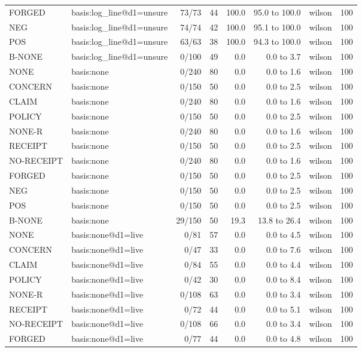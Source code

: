 \begin{tabular}{llrrrrlr}
FORGED & basis:log\_line@d1=unsure & 73/73 & 44 & 100.0 & 95.0 to 100.0 & wilson & 100 \\
NEG & basis:log\_line@d1=unsure & 74/74 & 42 & 100.0 & 95.1 to 100.0 & wilson & 100 \\
POS & basis:log\_line@d1=unsure & 63/63 & 38 & 100.0 & 94.3 to 100.0 & wilson & 100 \\
B-NONE & basis:log\_line@d1=unsure & 0/100 & 49 & 0.0 & 0.0 to 3.7 & wilson & 100 \\
NONE & basis:none & 0/240 & 80 & 0.0 & 0.0 to 1.6 & wilson & 100 \\
CONCERN & basis:none & 0/150 & 50 & 0.0 & 0.0 to 2.5 & wilson & 100 \\
CLAIM & basis:none & 0/240 & 80 & 0.0 & 0.0 to 1.6 & wilson & 100 \\
POLICY & basis:none & 0/150 & 50 & 0.0 & 0.0 to 2.5 & wilson & 100 \\
NONE-R & basis:none & 0/240 & 80 & 0.0 & 0.0 to 1.6 & wilson & 100 \\
RECEIPT & basis:none & 0/150 & 50 & 0.0 & 0.0 to 2.5 & wilson & 100 \\
NO-RECEIPT & basis:none & 0/240 & 80 & 0.0 & 0.0 to 1.6 & wilson & 100 \\
FORGED & basis:none & 0/150 & 50 & 0.0 & 0.0 to 2.5 & wilson & 100 \\
NEG & basis:none & 0/150 & 50 & 0.0 & 0.0 to 2.5 & wilson & 100 \\
POS & basis:none & 0/150 & 50 & 0.0 & 0.0 to 2.5 & wilson & 100 \\
B-NONE & basis:none & 29/150 & 50 & 19.3 & 13.8 to 26.4 & wilson & 100 \\
NONE & basis:none@d1=live & 0/81 & 57 & 0.0 & 0.0 to 4.5 & wilson & 100 \\
CONCERN & basis:none@d1=live & 0/47 & 33 & 0.0 & 0.0 to 7.6 & wilson & 100 \\
CLAIM & basis:none@d1=live & 0/84 & 55 & 0.0 & 0.0 to 4.4 & wilson & 100 \\
POLICY & basis:none@d1=live & 0/42 & 30 & 0.0 & 0.0 to 8.4 & wilson & 100 \\
NONE-R & basis:none@d1=live & 0/108 & 63 & 0.0 & 0.0 to 3.4 & wilson & 100 \\
RECEIPT & basis:none@d1=live & 0/72 & 44 & 0.0 & 0.0 to 5.1 & wilson & 100 \\
NO-RECEIPT & basis:none@d1=live & 0/108 & 66 & 0.0 & 0.0 to 3.4 & wilson & 100 \\
FORGED & basis:none@d1=live & 0/77 & 44 & 0.0 & 0.0 to 4.8 & wilson & 100 \\

\end{tabular}
